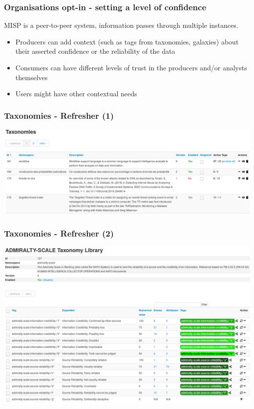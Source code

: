\begin{frame}
\frametitle{Organisations opt-in - setting a level of confidence}
    MISP is a peer-to-peer system, information passes through multiple instances.
    \begin{itemize}
        \item Producers can add context (such as tags from taxonomies, galaxies) about their asserted confidence or the reliability of the data
        \item Consumers can have different levels of trust in the producers and/or analysts themselves
        \item Users might have other contextual needs
    \end{itemize}
\end{frame}

\begin{frame}
    \frametitle{Taxonomies - Refresher (1)}
    \includegraphics[width=1.00\linewidth]{pics/taxonomies.png}
\end{frame}

\begin{frame}
    \frametitle{Taxonomies - Refresher (2)}
    \includegraphics[width=1.00\linewidth]{pics/taxonomy-admiralty-scale.png}
\end{frame}

